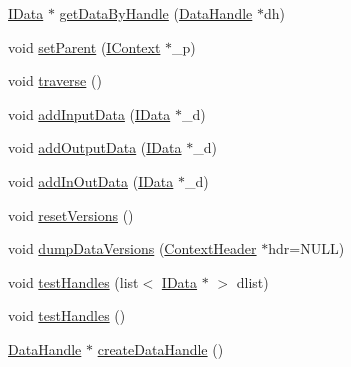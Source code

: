\begin{DoxyCompactItemize}
\item 
\hyperlink{class_i_data}{IData} $\ast$ \hyperlink{class_i_context_aebeefdc5ccb54aeb883e79665ddf2513}{getDataByHandle} (\hyperlink{struct_data_handle}{DataHandle} $\ast$dh)
\item 
void \hyperlink{class_i_context_ae51615a53a707370e7aec0fe9fbf9c28}{setParent} (\hyperlink{class_i_context}{IContext} $\ast$\_\-p)
\item 
void \hyperlink{class_i_context_a67fac0019748ff482ce820affb8603e2}{traverse} ()
\item 
void \hyperlink{class_i_context_abd000624cf8693096672e84231136980}{addInputData} (\hyperlink{class_i_data}{IData} $\ast$\_\-d)
\item 
void \hyperlink{class_i_context_ad6edf24b50c7ef64bb01dbdd12c88e57}{addOutputData} (\hyperlink{class_i_data}{IData} $\ast$\_\-d)
\item 
void \hyperlink{class_i_context_a6e2967c610f62b1e3d1411982efeead6}{addInOutData} (\hyperlink{class_i_data}{IData} $\ast$\_\-d)
\item 
void \hyperlink{class_i_context_aa6dd00242c03b780fa3b2394288b00ad}{resetVersions} ()
\item 
void \hyperlink{class_i_context_a7f31c062cbdd616553a6c46a4422a1cb}{dumpDataVersions} (\hyperlink{class_context_header}{ContextHeader} $\ast$hdr=NULL)
\item 
void \hyperlink{class_i_context_a4448138448c7a2a17ed1cfc3896ac3cf}{testHandles} (list$<$ \hyperlink{class_i_data}{IData} $\ast$ $>$ dlist)
\item 
void \hyperlink{class_i_context_adff746ec169ed33998d86aa306ee3d93}{testHandles} ()
\item 
\hyperlink{struct_data_handle}{DataHandle} $\ast$ \hyperlink{class_i_context_a2ef87189437c74906f961a523602b6c3}{createDataHandle} ()
\end{DoxyCompactItemize}
